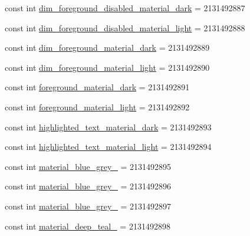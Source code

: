 \begin{DoxyCompactItemize}
\item 
const int \mbox{\hyperlink{class_f_w_p_s___app_1_1_droid_1_1_resource_1_1_color_a0c1077569c642bd218ed341280919fb3}{dim\+\_\+foreground\+\_\+disabled\+\_\+material\+\_\+dark}} = 2131492887
\item 
const int \mbox{\hyperlink{class_f_w_p_s___app_1_1_droid_1_1_resource_1_1_color_a6b97340dfb3c71504f4cb2076ae84f0f}{dim\+\_\+foreground\+\_\+disabled\+\_\+material\+\_\+light}} = 2131492888
\item 
const int \mbox{\hyperlink{class_f_w_p_s___app_1_1_droid_1_1_resource_1_1_color_a9b1dc62aefc3254e8db6ccd2d3f6be80}{dim\+\_\+foreground\+\_\+material\+\_\+dark}} = 2131492889
\item 
const int \mbox{\hyperlink{class_f_w_p_s___app_1_1_droid_1_1_resource_1_1_color_aff2aadb99d4502ab2f49e77a657aeb64}{dim\+\_\+foreground\+\_\+material\+\_\+light}} = 2131492890
\item 
const int \mbox{\hyperlink{class_f_w_p_s___app_1_1_droid_1_1_resource_1_1_color_a93dafa22b2f5df78f47b65aa00879ff8}{foreground\+\_\+material\+\_\+dark}} = 2131492891
\item 
const int \mbox{\hyperlink{class_f_w_p_s___app_1_1_droid_1_1_resource_1_1_color_aaaf4c47946e3be7ee8e4f2208ad28f3d}{foreground\+\_\+material\+\_\+light}} = 2131492892
\item 
const int \mbox{\hyperlink{class_f_w_p_s___app_1_1_droid_1_1_resource_1_1_color_acf70fcfb18362124737322655045644a}{highlighted\+\_\+text\+\_\+material\+\_\+dark}} = 2131492893
\item 
const int \mbox{\hyperlink{class_f_w_p_s___app_1_1_droid_1_1_resource_1_1_color_a2f4e0563c0d428e11bb8fb5a4faed5da}{highlighted\+\_\+text\+\_\+material\+\_\+light}} = 2131492894
\item 
const int \mbox{\hyperlink{class_f_w_p_s___app_1_1_droid_1_1_resource_1_1_color_afa519f6dc65a60d22f4cb65f5a47d0db}{material\+\_\+blue\+\_\+grey\+\_}} = 2131492895
\item 
const int \mbox{\hyperlink{class_f_w_p_s___app_1_1_droid_1_1_resource_1_1_color_a58895a0da1a2f7257e90d95130ca013e}{material\+\_\+blue\+\_\+grey\+\_}} = 2131492896
\item 
const int \mbox{\hyperlink{class_f_w_p_s___app_1_1_droid_1_1_resource_1_1_color_ac75fa1eb9b7154924baa575e76d48ed2}{material\+\_\+blue\+\_\+grey\+\_}} = 2131492897
\item 
const int \mbox{\hyperlink{class_f_w_p_s___app_1_1_droid_1_1_resource_1_1_color_ad1d9fe9fc58fbc2ff890c085052df545}{material\+\_\+deep\+\_\+teal\+\_}} = 2131492898

\end{DoxyCompactItemize}
